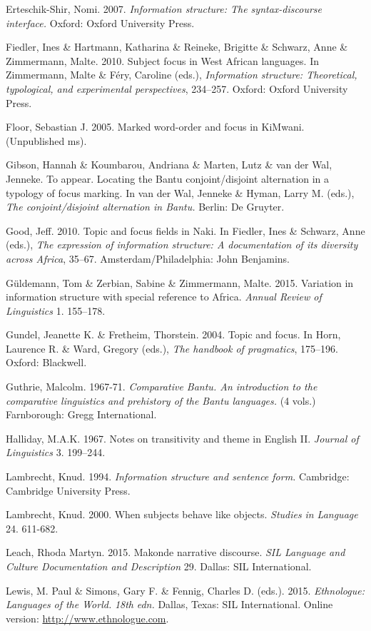 \documentclass[output=paper]{langsci/langscibook}
\begin{document}
Erteschik-Shir, Nomi. 2007. \textit{Information structure: The syntax-discourse interface.} Oxford: Oxford University Press.

Fiedler, Ines \& Hartmann, Katharina \& Reineke, Brigitte \& Schwarz, Anne \& Zimmermann, Malte. 2010. Subject focus in West African languages. In Zimmermann, Malte \& Féry, Caroline (eds.), \textit{Information structure: Theoretical, typological, and experimental perspectives}, 234–257. Oxford: Oxford University Press.

Floor, Sebastian J. 2005. Marked word-order and focus in KiMwani. (Unpublished ms).

Gibson, Hannah \& Koumbarou, Andriana \& Marten, Lutz \& van der Wal, Jenneke. To appear. Locating the Bantu conjoint/disjoint alternation in a typology of focus marking. In van der Wal, Jenneke \& Hyman, Larry M. (eds.), \textit{The conjoint/disjoint alternation in Bantu.} Berlin: De Gruyter.

Good, Jeff. 2010. Topic and focus fields in Naki. In Fiedler, Ines \& Schwarz, Anne (eds.), \textit{The expression of information structure: A documentation of its diversity across Africa}, 35–67. Amsterdam/Philadelphia: John Benjamins.

Güldemann, Tom \& Zerbian, Sabine \& Zimmermann, Malte. 2015. Variation in information structure with special reference to Africa. \textit{Annual Review of Linguistics} 1. 155–178.

Gundel, Jeanette K. \& Fretheim, Thorstein. 2004. Topic and focus. In Horn, Laurence R. \& Ward, Gregory (eds.), \textit{The handbook of pragmatics}, 175–196. Oxford: Blackwell.

Guthrie, Malcolm. 1967-71. \textit{Comparative Bantu. An introduction to the comparative linguistics and prehistory of the Bantu languages.} (4 vols.) Farnborough: Gregg International.

Halliday, M.A.K. 1967. Notes on transitivity and theme in English II. \textit{Journal of Linguistics} 3. 199–244.

Lambrecht, Knud. 1994. \textit{Information structure and sentence form. }Cambridge: Cambridge University Press.

Lambrecht, Knud. 2000. When subjects behave like objects. \textit{Studies }\textit{in Language} 24. 611-682.

Leach, Rhoda Martyn. 2015. Makonde narrative discourse. \textit{SIL Language and Culture Documentation and Description} 29. Dallas: SIL International.

Lewis, M. Paul \& Simons, Gary F. \& Fennig, Charles D. (eds.). 2015. \emph{Ethnologue: Languages}\emph{ of the World. }\emph{18}\emph{th}\emph{ edn. }Dallas, Texas: SIL International. Online version: \href{http://www.ethnologue.com/}{http://www.ethnologue.com}.
\end{document}
